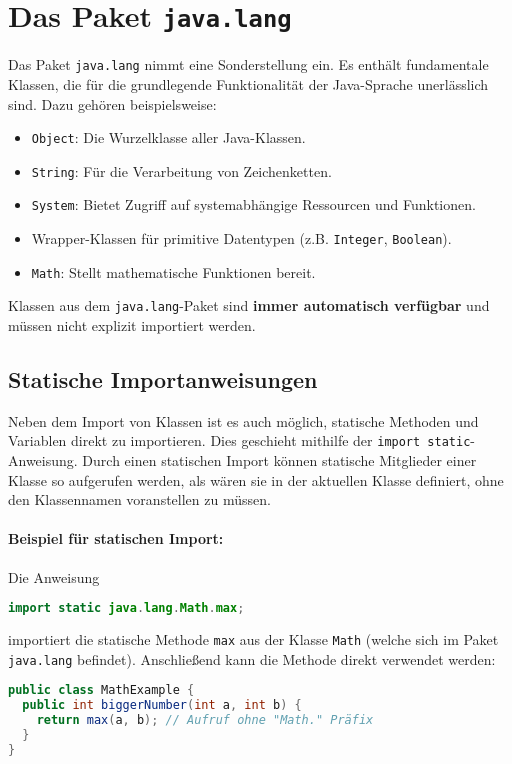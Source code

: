 \section{Das Paket \texttt{java.lang}}
\label{sec:java_lang}

Das Paket \texttt{java.lang} nimmt eine Sonderstellung ein. Es enthält fundamentale Klassen, die für die grundlegende 
Funktionalität der Java-Sprache unerlässlich sind. Dazu gehören beispielsweise:
\begin{itemize}
    \item \texttt{Object}: Die Wurzelklasse aller Java-Klassen.
    \item \texttt{String}: Für die Verarbeitung von Zeichenketten.
    \item \texttt{System}: Bietet Zugriff auf systemabhängige Ressourcen und Funktionen.
    \item Wrapper-Klassen für primitive Datentypen (z.B. \texttt{Integer}, \texttt{Boolean}).
    \item \texttt{Math}: Stellt mathematische Funktionen bereit.
\end{itemize}
Klassen aus dem \texttt{java.lang}-Paket sind \textbf{immer automatisch verfügbar} und müssen nicht explizit importiert werden.

\subsection{Statische Importanweisungen}
\label{ssec:statische_importe}

Neben dem Import von Klassen ist es auch möglich, statische Methoden und Variablen direkt zu importieren. 
Dies geschieht mithilfe der \texttt{import static}-Anweisung.
Durch einen statischen Import können statische Mitglieder einer Klasse so aufgerufen werden, als wären sie 
in der aktuellen Klasse definiert, ohne den Klassennamen voranstellen zu müssen.

\paragraph{Beispiel für statischen Import:}
Die Anweisung
\begin{lstlisting}[language=Java, caption={Statischer Import der max-Methode}]
import static java.lang.Math.max;
\end{lstlisting}
importiert die statische Methode \texttt{max} aus der Klasse \texttt{Math} (welche sich im Paket \texttt{java.lang} befindet).
Anschließend kann die Methode direkt verwendet werden:
\begin{lstlisting}[language=Java, caption={Verwendung nach statischem Import}]
public class MathExample {
  public int biggerNumber(int a, int b) {
    return max(a, b); // Aufruf ohne "Math." Präfix
  }
}
\end{lstlisting}

